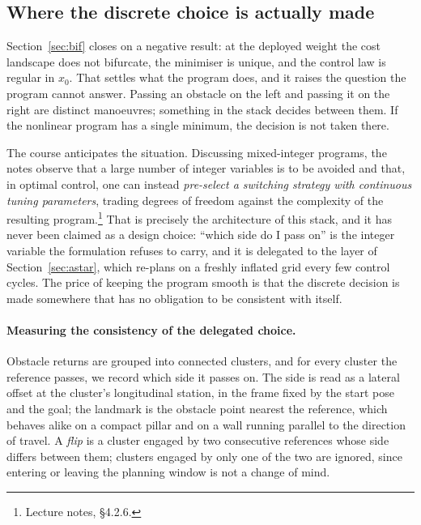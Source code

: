 %

\subsection{Where the discrete choice is actually made}
\label{sec:homotopy}

Section~\ref{sec:bif} closes on a negative result: at the deployed weight the cost landscape does not
bifurcate, the minimiser is unique, and the control law is regular in $x_0$. That settles what the program
does, and it raises the question the program cannot answer. Passing an obstacle on the left and passing it on
the right are distinct manoeuvres; something in the stack decides between them. If the nonlinear program has
a single minimum, the decision is not taken there.

The course anticipates the situation. Discussing mixed-integer programs, the notes observe that a large
number of integer variables is to be avoided and that, in optimal control, one can instead
\emph{pre-select a switching strategy with continuous tuning parameters}, trading degrees of freedom against
the complexity of the resulting program.\footnote{Lecture notes, \S4.2.6.} That is precisely the architecture
of this stack, and it has never been claimed as a design choice: ``which side do I pass on'' is the integer
variable the formulation refuses to carry, and it is delegated to the \astar{} layer of
Section~\ref{sec:astar}, which re-plans on a freshly inflated grid every few control cycles. The price of
keeping the program smooth is that the discrete decision is made somewhere that has no obligation to be
consistent with itself.

\paragraph{Measuring the consistency of the delegated choice.}
Obstacle returns are grouped into connected clusters, and for every cluster the reference passes, we record
which side it passes on. The side is read as a lateral offset at the cluster's longitudinal station, in the
frame fixed by the start pose and the goal; the landmark is the obstacle point nearest the reference, which
behaves alike on a compact pillar and on a wall running parallel to the direction of travel. A \emph{flip} is
a cluster engaged by two consecutive references whose side differs between them; clusters engaged by only one
of the two are ignored, since entering or leaving the planning window is not a change of mind.

